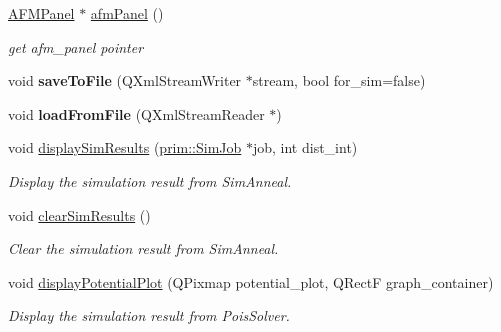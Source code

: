 \begin{DoxyCompactItemize}
\item 
\hyperlink{classgui_1_1AFMPanel}{A\+F\+M\+Panel} $\ast$ \hyperlink{classgui_1_1DesignPanel_a76f25799b519339e53e951fa9f6eb597}{afm\+Panel} ()\hypertarget{classgui_1_1DesignPanel_a76f25799b519339e53e951fa9f6eb597}{}\label{classgui_1_1DesignPanel_a76f25799b519339e53e951fa9f6eb597}

\begin{DoxyCompactList}\small\item\em get afm\+\_\+panel pointer \end{DoxyCompactList}\item 
void {\bfseries save\+To\+File} (Q\+Xml\+Stream\+Writer $\ast$stream, bool for\+\_\+sim=false)\hypertarget{classgui_1_1DesignPanel_a3f34cb05bdfe693d07c097f2784b5f40}{}\label{classgui_1_1DesignPanel_a3f34cb05bdfe693d07c097f2784b5f40}

\item 
void {\bfseries load\+From\+File} (Q\+Xml\+Stream\+Reader $\ast$)\hypertarget{classgui_1_1DesignPanel_a799a270095220ebaaedef8a9b8a8e14c}{}\label{classgui_1_1DesignPanel_a799a270095220ebaaedef8a9b8a8e14c}

\item 
void \hyperlink{classgui_1_1DesignPanel_a559d39b09e6e02908d54dbbe79ed09d8}{display\+Sim\+Results} (\hyperlink{classprim_1_1SimJob}{prim\+::\+Sim\+Job} $\ast$job, int dist\+\_\+int)\hypertarget{classgui_1_1DesignPanel_a559d39b09e6e02908d54dbbe79ed09d8}{}\label{classgui_1_1DesignPanel_a559d39b09e6e02908d54dbbe79ed09d8}

\begin{DoxyCompactList}\small\item\em Display the simulation result from Sim\+Anneal. \end{DoxyCompactList}\item 
void \hyperlink{classgui_1_1DesignPanel_a4c6211776b5a543ac6c47b314f5afc4e}{clear\+Sim\+Results} ()\hypertarget{classgui_1_1DesignPanel_a4c6211776b5a543ac6c47b314f5afc4e}{}\label{classgui_1_1DesignPanel_a4c6211776b5a543ac6c47b314f5afc4e}

\begin{DoxyCompactList}\small\item\em Clear the simulation result from Sim\+Anneal. \end{DoxyCompactList}\item 
void \hyperlink{classgui_1_1DesignPanel_a66945b01b2d6b1599f22c038ea3d6706}{display\+Potential\+Plot} (Q\+Pixmap potential\+\_\+plot, Q\+RectF graph\+\_\+container)\hypertarget{classgui_1_1DesignPanel_a66945b01b2d6b1599f22c038ea3d6706}{}\label{classgui_1_1DesignPanel_a66945b01b2d6b1599f22c038ea3d6706}

\begin{DoxyCompactList}\small\item\em Display the simulation result from Pois\+Solver. \end{DoxyCompactList}\end{DoxyCompactItemize}

